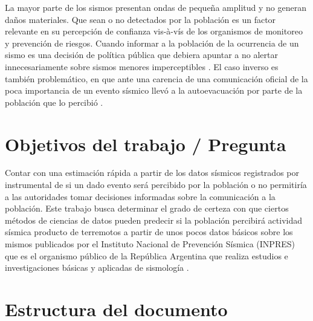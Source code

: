\documentclass[a4paper]{report}
\begin{document}
La mayor parte de los sismos presentan ondas de pequeña amplitud y no generan daños materiales.
Que sean o no detectados por la población es un factor relevante en su percepción de confianza vis-à-vís de los organismos de monitoreo y prevención de riesgos.
Cuando informar a la población de la ocurrencia de un sismo es una decisión de política pública que debiera apuntar a no alertar innecesariamente sobre sismos menores imperceptibles \cite{saunders_j_k_twist_nodate}.
El caso inverso es también problemático, en que ante una carencia de una comunicación oficial de la poca importancia de un evento sísmico llevó a la autoevacuación por parte de la población que lo percibió \cite{vaiciulyte_population_2022}. 



\section{Objetivos del trabajo / Pregunta}\label{sec:objetivo}

Contar con una estimación rápida a partir de los datos sísmicos registrados por instrumental de si un dado evento será percibido por la población o no permitiría a las autoridades tomar decisiones informadas sobre la comunicación a la población.
Este trabajo busca determinar el grado de certeza con que ciertos métodos de ciencias de datos pueden predecir si la población percibirá actividad sísmica producto de terremotos a partir de unos pocos datos básicos sobre los mismos publicados por el Instituto Nacional de Prevención Sísmica (INPRES) que es el organismo público de la República Argentina que realiza estudios e investigaciones básicas y aplicadas de sismología \cite{noauthor_instituto_2022}.



\section{Estructura del documento}
\end{document}
